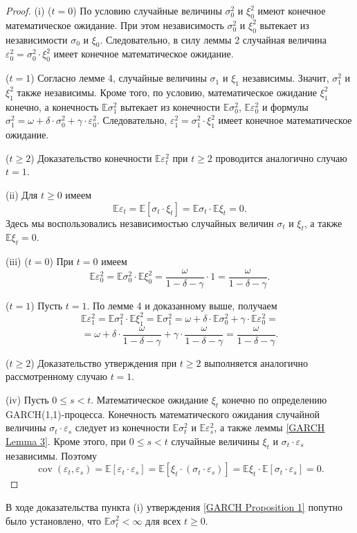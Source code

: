 \begin{proof}
(i) ($t=0$) По условию случайные величины $\sigma_0^2$ и $\xi_0^2$ имеют конечное математическое ожидание. При этом независимость $\sigma_0^2$ и $\xi_0^2$ вытекает из независимости $\sigma_0$ и $\xi_0$. Следовательно, в силу леммы 2 случайная величина $\varepsilon_0^2 = \sigma_0^2\cdot\xi_0^2$ имеет конечное математическое ожидание.

($t=1$) Согласно лемме 4, случайные величины $\sigma_1$ и $\xi_1$ независимы. Значит, $\sigma_1^2$ и $\xi_1^2$ также независимы. Кроме того, по условию, математическое ожидание $\xi_1^2$ конечно, а конечность $\mathbb{E}{\sigma_1^2}$ вытекает из конечности $\mathbb{E}{\sigma_0^2}$, $\mathbb{E}{\varepsilon_0^2}$ и формулы $\sigma_1^2 = \omega + \delta\cdot\sigma_0^2 + \gamma\cdot\varepsilon_0^2$. Следовательно, $\varepsilon_1^2 = \sigma_1^2\cdot\xi_1^2$ имеет конечное математическое ожидание.

($t\geq2$) Доказательство конечности $\mathbb{E}{\varepsilon_t^2}$ при $t\geq2$ проводится аналогично случаю $t = 1$.

(ii) Для $t\geq0$ имеем
\[
    \mathbb{E}\varepsilon_t = \mathbb{E}[\sigma_t\cdot\xi_t] = \mathbb{E}{\sigma_t}\cdot\mathbb{E}{\xi_t} = 0 \text{.}
\]
Здесь мы воспользовались независимостью случайных величин $\sigma_t$ и $\xi_t$, а также $\mathbb{E}{\xi_t} = 0$.

(iii) ($t=0$) При $t=0$ имеем
\[
    \mathbb{E}{\varepsilon_0^2} = \mathbb{E}{\sigma_0^2}\cdot\mathbb{E}{\xi_0^2} = \frac{\omega}{1-\delta -\gamma}\cdot1 = \frac{\omega}{1-\delta -\gamma} \text{.}
\]

($t=1$) Пусть $t=1$. По лемме 4 и доказанному выше, получаем
\[
    \mathbb{E}{\varepsilon_1^2} = \mathbb{E}{\sigma_1^2}\cdot\mathbb{E}{\xi_1^2} = \mathbb{E}{\sigma_1^2} = \omega + \delta\cdot\mathbb{E}{\sigma_0^2} + \gamma\cdot\mathbb{E}{\varepsilon_0^2} =
\]
\[
    =\omega + \delta\cdot{\frac{\omega}{1-\delta -\gamma}} + \gamma\cdot{\frac{\omega}{1-\delta -\gamma}} = \frac{\omega}{1-\delta -\gamma} \text{.}
\]

($t\geq2$) Доказательство утверждения при $t\geq2$ выполняется аналогично рассмотренному случаю $t=1$.

(iv) Пусть $0\leq{s}<t$. Математическое ожидание $\xi_t$ конечно по определению GARCH(1,1)-процесса. Конечность математического ожидания случайной величины $\sigma_t\cdot\varepsilon_s$ следует из конечности $\mathbb{E}{\sigma_t^2}$ и $\mathbb{E}{\varepsilon_s^2}$, а также леммы \ref{GARCH Lemma 3}. Кроме этого, при $0\leq{s}<t$ случайные величины $\xi_t$ и $\sigma_t\cdot\varepsilon_s$ независимы. Поэтому
\[
    \operatorname{cov}(\varepsilon_t,\varepsilon_s) = \mathbb{E}[\varepsilon_t\cdot\varepsilon_s] = \mathbb{E}[\xi_t\cdot(\sigma_t\cdot\varepsilon_s)] = \mathbb{E}{\xi_t}\cdot\mathbb{E}[\sigma_t\cdot\varepsilon_s] = 0 \text{.}
\]
\end{proof}

\begin{Remark}
В ходе доказательства пункта (i) утверждения \ref{GARCH Proposition 1} попутно было установлено, что $\mathbb{E}\sigma_t^2 < \infty$ для всех $t \geq 0$.
\end{Remark}

